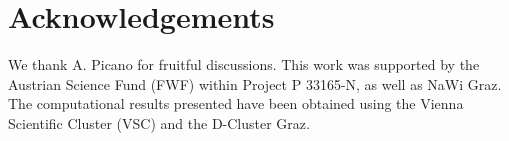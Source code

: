 \documentclass[aps,prb,groupedaddress,showpacs,twocolumn,superscriptaddress,10pt]{revtex4-2}
\begin{document}
  
   
\section*{Acknowledgements}

We thank A. Picano for fruitful discussions. This work was supported by the Austrian Science Fund (FWF) within Project P 33165-N, as well as NaWi Graz. The computational results presented have been obtained using the Vienna Scientific Cluster (VSC) and the D-Cluster Graz.
 
   
   
 
 
%  
%
% 
%
\end{document}
